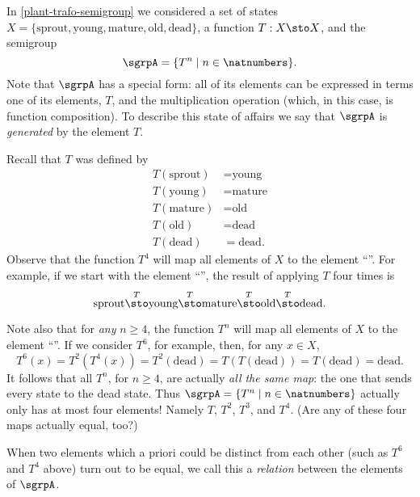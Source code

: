 

\section{}


In \cref{plant-trafo-semigroup} we considered a set of states $X = \{ \text{sprout}, \text{young}, \text{mature}, \text{old}, \text{dead} \}$, a function $T: X \sto X$, and the semigroup
\begin{equation}
\sgrpA = \{ T^n \mid n \in \natnumbers \}.
\end{equation}
Note that $\sgrpA$ has a special form: all of its elements can be expressed in terms one of its elements, $T$, and the multiplication operation (which, in this case, is function composition). To describe this state of affairs we say that $\sgrpA$ is \emph{generated} by the element $T$.


Recall that $T$ was defined by
\begin{align*}
T(\text{sprout}) &=  \text{young} \\
T(\text{young}) &=  \text{mature} \\
T(\text{mature}) &=  \text{old} \\
T( \text{old}) &= \text{dead} \\
T (\text{dead}) &= \text{dead}.
\end{align*}
Observe that the function $T^4$ will map all elements of $X$ to the element ``''. For example, if we start with the element ``'', the result of applying $T$ four times is
$$
\text{sprout} \overset{T}{\sto} \text{young} \overset{T}{\sto} \text{mature} \overset{T}{\sto} \text{old} \overset{T}{\sto} \text{dead}.
$$

Note also that for \emph{any} $n \geq 4$, the function $T^n$ will map all elements of $X$ to the element ``''.
If we consider $T^6$, for example, then, for any $x \in X$,
$$
T^6(x) = T^2(T^4(x)) = T^2(\text{dead}) = T(T(\text{dead})) = T(\text{dead}) = \text{dead}.
$$
It follows that all $T^n$, for $n \geq 4$, are actually \emph{all the same map}: the one that sends every state to the dead state. Thus $\sgrpA = \{ T^n \mid n \in \natnumbers \}$ actually only has at most four elements! Namely $T$, $T^2$, $T^3$, and $T^4$. (Are any of these four maps actually equal, too?)

When two elements which a priori could be distinct from each other (such as $T^6$ and $T^4$ above) turn out to be equal, we call this a \emph{relation} between the elements of $\sgrpA$.

